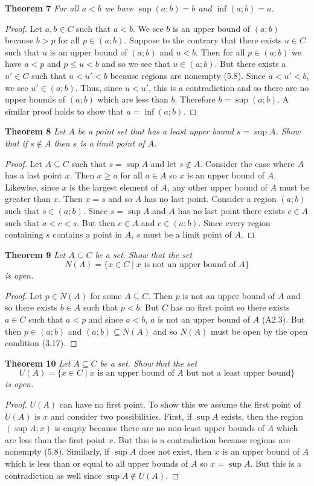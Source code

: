 \documentclass{article}
\begin{document}
\begin{flushleft}
\textbf{Theorem 7}
\textsl{For all $a < b$ we have $\sup (a;b) = b$ and $\inf (a;b) = a$.}
\begin{proof}
Let $a,b \in C$ such that $a < b$. We see $b$ is an upper bound of $(a;b)$ because $b>p$ for all $p \in (a;b)$. Suppose to the contrary that there exists $u \in C$ such that $u$ is an upper bound of $(a;b)$ and $u < b$. Then for all $p \in (a;b)$ we have $a<p$ and $p \leq u<b$ and so we see that $u \in (a;b)$. But there exists a $u' \in C$ such that $u < u' < b$ because regions are nonempty (5.8). Since $a<u'<b$, we see $u' \in (a;b)$. Thus, since $u<u'$, this is a contradiction and so there are no upper bounds of $(a;b)$ which are less than $b$. Therefore $b = \sup (a;b)$. A similar proof holds to show that $a = \inf (a;b)$.
\end{proof}

\textbf{Theorem 8}
\textsl{Let $A$ be a point set that has a least upper bound $s = \sup A$. Show that if $s \notin A$ then $s$ is a limit point of $A$.}
\begin{proof}
Let $A \subseteq C$ such that $s = \sup A$ and let $s \notin A$. Consider the case where $A$ has a last point $x$. Then $x \geq a$ for all $a \in A$ so $x$ is an upper bound of $A$. Likewise, since $x$ is the largest element of $A$, any other upper bound of $A$ must be greater than $x$. Then $x = s$ and so $A$ has no last point. Consider a region $(a;b)$ such that $s \in (a;b)$. Since $s = \sup A$ and $A$ has no last point there exists $c \in A$ such that $a < c < s$. But then $c \in A$ and $c \in (a;b)$. Since every region containing $s$ contains a point in $A$, $s$ must be a limit point of $A$.
\end{proof}

\textbf{Theorem 9}
\textsl{Let $A \subseteq C$ be a set. Show that the set
\[
N(A) = \{x \in C \mid x \text{ is not an upper bound of } A\}
\]
is open.}
\begin{proof}
Let $p \in N(A)$ for some $A \subseteq C$. Then $p$ is not an upper bound of $A$ and so there exists $b \in A$ such that $p < b$. But $C$ has no first point so there exists $a \in C$ such that $a<p$ and since $a<b$, $a$ is not an upper bound of $A$ (A2.3). But then $p \in (a;b)$ and $(a;b) \subseteq N(A)$ and so $N(A)$ must be open by the open condition (3.17).
\end{proof}

\textbf{Theorem 10}
\textsl{Let $A \subseteq C$ be a set. Show that the set
\[
U(A) = \{x \in C \mid x \text{ is an upper bound of } A \text{ but not a least upper bound} \}
\]
is open.}
\begin{proof}
$U(A)$ can have no first point. To show this we assume the first point of $U(A)$ is $x$ and consider two possibilities. First, if $\sup A$ exists, then the region $(\sup A;x)$ is empty because there are no non-least upper bounds of $A$ which are less than the first point $x$. But this is a contradiction because regions are nonempty (5.8). Similarly, if $\sup A$ does not exist, then $x$ is an upper bound of $A$ which is less than or equal to all upper bounds of $A$ so $x = \sup A$. But this is a contradiction as well since $\sup A \notin U(A)$.\newline


\end{proof}
\end{flushleft}
\end{document}
